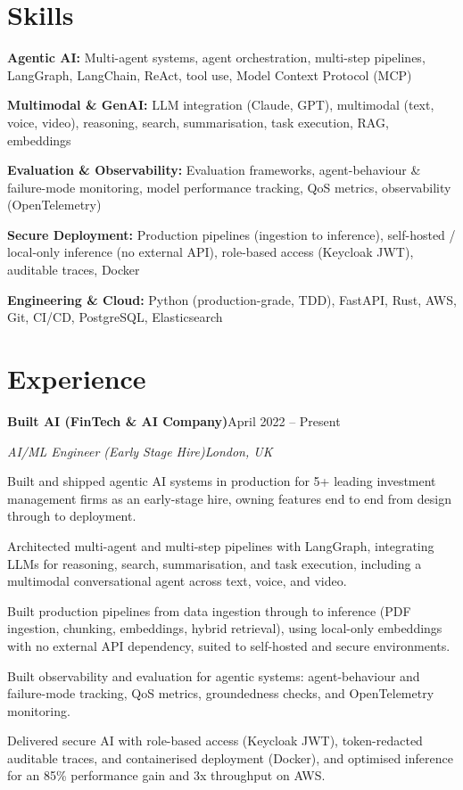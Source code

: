 \documentclass[10pt,a4paper]{article}
\newcommand{\entry}[4]{%
  {\color{company}\bfseries #1}\hfill {\color{muted}#2}\par
  \vspace{1pt}
  {\itshape #3}\hfill {\color{muted}\itshape #4}\par
  \vspace{3pt}%
}
\begin{document}
\section{Skills}
\begin{tight}
  \item[\textcolor{accent}{\small$\bullet$}] \textbf{Agentic AI:} Multi-agent systems, agent orchestration, multi-step pipelines, LangGraph, LangChain, ReAct, tool use, Model Context Protocol (MCP)
  \item[\textcolor{accent}{\small$\bullet$}] \textbf{Multimodal \& GenAI:} LLM integration (Claude, GPT), multimodal (text, voice, video), reasoning, search, summarisation, task execution, RAG, embeddings
  \item[\textcolor{accent}{\small$\bullet$}] \textbf{Evaluation \& Observability:} Evaluation frameworks, agent-behaviour \& failure-mode monitoring, model performance tracking, QoS metrics, observability (OpenTelemetry)
  \item[\textcolor{accent}{\small$\bullet$}] \textbf{Secure Deployment:} Production pipelines (ingestion to inference), self-hosted / local-only inference (no external API), role-based access (Keycloak JWT), auditable traces, Docker
  \item[\textcolor{accent}{\small$\bullet$}] \textbf{Engineering \& Cloud:} Python (production-grade, TDD), FastAPI, Rust, AWS, Git, CI/CD, PostgreSQL, Elasticsearch
\end{tight}

\section{Experience}
\entry{Built AI (FinTech \& AI Company)}{April 2022 -- Present}{AI/ML Engineer (Early Stage Hire)}{London, UK}
\begin{tight}
  \item Built and shipped agentic AI systems in production for 5+ leading investment management firms as an early-stage hire, owning features end to end from design through to deployment.
  \item Architected multi-agent and multi-step pipelines with LangGraph, integrating LLMs for reasoning, search, summarisation, and task execution, including a multimodal conversational agent across text, voice, and video.
  \item Built production pipelines from data ingestion through to inference (PDF ingestion, chunking, embeddings, hybrid retrieval), using local-only embeddings with no external API dependency, suited to self-hosted and secure environments.
  \item Built observability and evaluation for agentic systems: agent-behaviour and failure-mode tracking, QoS metrics, groundedness checks, and OpenTelemetry monitoring.
  \item Delivered secure AI with role-based access (Keycloak JWT), token-redacted auditable traces, and containerised deployment (Docker), and optimised inference for an 85\% performance gain and 3x throughput on AWS.
\end{tight}
\end{document}
